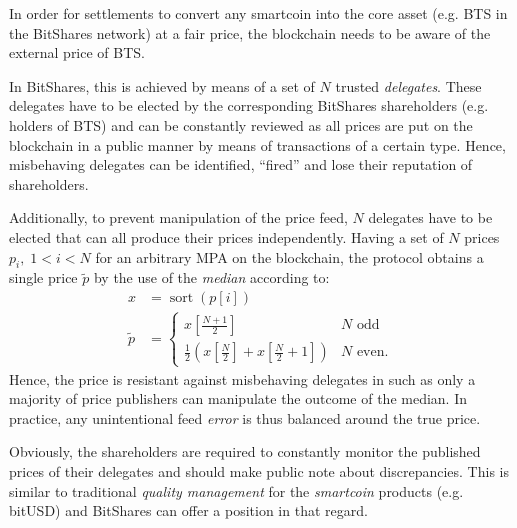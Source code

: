 \label{sec:feeds}

In order for settlements to convert any smartcoin into the core asset (e.g. BTS
in the BitShares network) at a fair price, the blockchain needs to be aware of
the external price of BTS.

In BitShares, this is achieved by means of a set of $N$ trusted
\emph{delegates}. These delegates have to be elected by the corresponding
BitShares shareholders (e.g. holders of BTS) and can be constantly reviewed as
all prices are put on the blockchain in a public manner by means of
transactions of a certain type. Hence, misbehaving delegates can be identified,
``fired'' and lose their reputation of shareholders.

Additionally, to prevent manipulation of the price feed, $N$ delegates have to
be elected that can all produce their prices independently. Having a set of $N$
prices $p_i,\;1<i<N$ for an arbitrary MPA on the blockchain, the protocol
obtains a single price $\tilde{p}$ by the use of the \emph{median} according
to:
\begin{align}
 x &= \operatorname{sort}(p[i])\\
 \tilde p &=\begin{cases}
   x[\frac{N+1}{2}]                                               & N \text{ odd}\\
   \frac {1}{2}\left(x[{\frac{N}{2}}] + x[\frac{N}{2} + 1]\right) & N \text{ even.}
 \end{cases}
\end{align}
Hence, the price is resistant against misbehaving delegates in such as only a
majority of price publishers can manipulate the outcome of the median. In
practice, any unintentional feed \emph{error} is thus balanced around the true
price. %

Obviously, the shareholders are required to constantly monitor the published
prices of their delegates and should make public note about discrepancies. This
is similar to traditional \emph{quality management} for the \emph{smartcoin}
products (e.g. bitUSD) and BitShares can offer a position in that regard.
